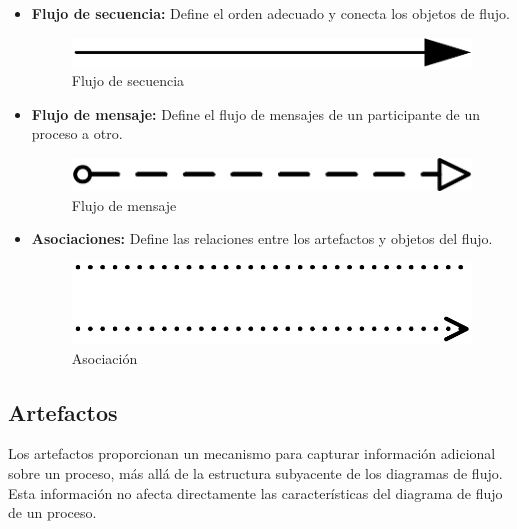 \begin{itemize}
	\item \textbf{Flujo de secuencia: }Define el orden adecuado y conecta los objetos de flujo.
	\begin{figure}[H]
		\centering
		\includegraphics[scale=0.2]{Capitulo2/imagenes/FlujoDeSecuencia.png}
		\caption{Flujo de secuencia}
		\label{FSecuencia}
	\end{figure}
	\item \textbf{Flujo de mensaje: }Define el flujo de mensajes de un participante de un proceso a otro.
	\begin{figure}[H]
		\centering
		\includegraphics[scale=0.2]{Capitulo2/imagenes/FlujoDeMensaje.png}
		\caption{Flujo de mensaje}
		\label{FMensaje}
	\end{figure}
	\item \textbf{Asociaciones: }Define las relaciones entre los artefactos y objetos del flujo.
	\begin{figure}[H]
		\centering
		\includegraphics[scale=0.2]{Capitulo2/imagenes/Asociacion.png}
		\caption{Asociación}
		\label{Asociación}
	\end{figure}
\end{itemize}
\subsection{Artefactos}
Los artefactos proporcionan un mecanismo para capturar información adicional sobre un proceso, más allá de la estructura subyacente de los diagramas de flujo. Esta información no afecta directamente las características del diagrama de flujo de un proceso.

